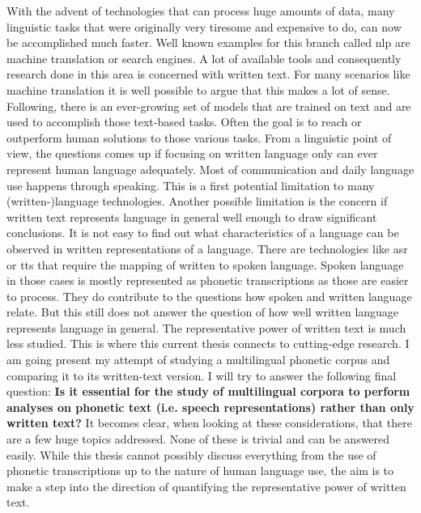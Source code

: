 
\label{chap:1_intro}

With the advent of technologies that can process huge amounts of data, many linguistic tasks that were originally very tiresome and expensive to do, can now be accomplished much faster. Well known examples for this branch called \ac{nlp} are machine translation or search engines. A lot of available tools and consequently research done in this area is concerned with written text. For many scenarios like machine translation it is well possible to argue that this makes a lot of sense. Following, there is an ever-growing set of models that are trained on text and are used to accomplish those text-based tasks. Often the goal is to reach or outperform human solutions to those various tasks. From a linguistic point of view, the questions comes up if focusing on written language only can ever represent human language adequately. Most of communication and daily language use happens through speaking. This is a first potential limitation to many (written-)language technologies. Another possible limitation is the concern if written text represents language in general well enough to draw significant conclusions. It is not easy to find out what characteristics of a language can be observed in written representations of a language. There are technologies like \ac{asr} or \ac{tts} that require the mapping of written to spoken language. Spoken language in those cases is mostly represented as phonetic transcriptions as those are easier to process. They do contribute to the questions how spoken and written language relate. But this still does not answer the question of how well written language represents language in general. The representative power of written text is much less studied. This is where this current thesis connects to cutting-edge research. I am going present my attempt of studying a multilingual phonetic corpus and comparing it to its written-text version. I will try to answer the following final question: \textbf{Is it essential for the study of multilingual corpora to perform analyses on phonetic text (i.e. speech representations) rather than only written text?} It becomes clear, when looking at these considerations, that there are a few huge topics addressed. None of these is trivial and can be answered easily. While this thesis cannot possibly discuss everything from the use of phonetic transcriptions up to the nature of human language use, the aim is to make a step into the direction of quantifying the representative power of written text. 




